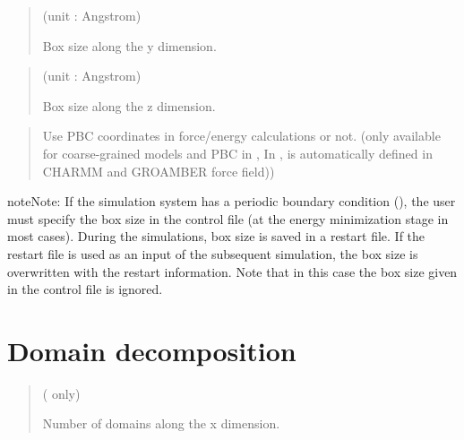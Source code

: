 \documentclass[a4paper,11pt,oneside,english]{sphinxmanual}
\begin{document}
 
\begin{quote}

 (unit : Angstrom)

Box size along the y dimension.
\end{quote}

 
\begin{quote}

 (unit : Angstrom)

Box size along the z dimension.
\end{quote}

 
\begin{quote}


Use PBC coordinates in force/energy calculations or not.  (only available for coarse-grained models and PBC in , In ,  is automatically defined in CHARMM and GROAMBER force field))
\end{quote}

\begin{sphinxadmonition}{note}{Note:}
If the simulation system has a periodic boundary condition (),
the user must specify the box size in the control file
(at the energy minimization stage in most cases).
During the simulations, box size is saved in a restart file.
If the restart file is used as an input of the subsequent simulation,
the box size is overwritten with the restart information.
Note that in this case the box size given in the control file is ignored.
\end{sphinxadmonition}


\section{Domain decomposition}
\label{\detokenize{10_Boundary:domain-decomposition}}
 
\begin{quote}

 ( only)

Number of domains along the x dimension.
\end{quote}
\end{document}
